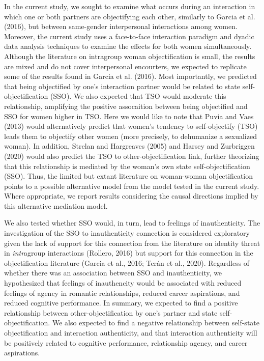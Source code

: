 \documentclass[man]{apa6}
\begin{document}
In the current study, we sought to examine what occurs during an
interaction in which one or both partners are objectifying each other,
similarly to Garcia et al. (2016), but between same-gender interpersonal
interactions among women. Moreover, the current study uses a
face-to-face interaction paradigm and dyadic data analysis techniques to
examine the effects for both women simultaneously. Although the
literature on intragroup woman objectification is small, the results are
mixed and do not cover interpersonal encourters, we expected to
replicate some of the results found in Garcia et al. (2016). Most
importantly, we predicted that being objectified by one's interaction
partner would be related to state self-objectification (SSO). We also
expected that TSO would moderate this relationship, amplifying the
positive assocaition between being objectified and SSO for women higher
in TSO. Here we would like to note that Puvia and Vaes (2013) would
alternatively predict that women's tendency to self-objectify (TSO)
leads them to objectify other women (more precisely, to dehumanize a
sexualized woman). In addition, Strelan and Hargreaves (2005) and Harsey
and Zurbriggen (2020) would also predict the TSO to
other-objectification link, further theorizing that this relationship is
mediated by the woman's own state self-objectification (SSO). Thus, the
limited but extant literature on woman-woman objectification points to a
possible alternative model from the model tested in the current study.
Where appropriate, we report results considering the causal directions
implied by this alternative mediation model.

We also tested whether SSO would, in turn, lead to feelings of
inauthenticity. The investigation of the SSO to inauthenticity
connection is considered exploratory given the lack of support for this
connection from the literature on identity threat in \emph{intr}agroup
interactions (Rollero, 2016) but support for this connection in the
objectification literature (Garcia et al., 2016; Terán et al., 2020).
Regardless of whether there was an association between SSO and
inauthenticity, we hypothesized that feelings of inauthencity would be
associated with reduced feelings of agency in romantic relationships,
reduced career aspirations, and reduced cognitive performance. In
summary, we expected to find a positive relationship between
other-objectification by one's partner and state self-objectification.
We also expected to find a negative relationship between self-state
objectification and interaction authenticity, and that interaction
authenticity will be positively related to cognitive performance,
relationship agency, and career aspirations.
\end{document}
